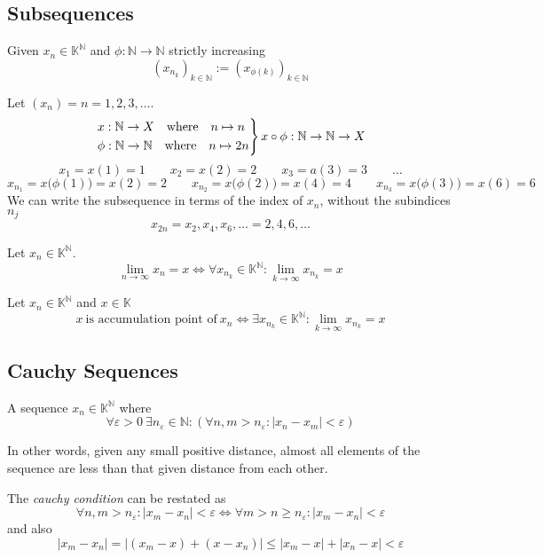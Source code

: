 \subsection{Subsequences}
\begin{definition}[Subsequence]
   Given \(x_n \in \mathbb{K}^\mathbb{N}\) and \(\phi: \mathbb{N} \to \mathbb{N}\) strictly increasing
   \[(x_{n_k})_{k \in \mathbb{N}} := (x_{\phi(k)})_{k \in \mathbb{N}}\]
\end{definition}
\begin{example}
   Let \((x_n) = n = 1, 2, 3, \ldots\).
   \[\begin{drcases}
         x: \mathbb{N} \to X \quad\text{where}\quad n \mapsto n \\
         \phi: \mathbb{N} \to \mathbb{N} \quad\text{where}\quad n \mapsto 2n
   \end{drcases} x \circ \phi: \mathbb{N} \to \mathbb{N} \to X\]
   \[x_1 = x(1) = 1 \qquad x_2 = x(2) = 2 \qquad x_3 = a(3) = 3 \qquad \ldots\]
   \[x_{n_1} = x\big(\phi(1)\big) = x(2) = 2 \qquad x_{n_2} = x\big(\phi(2)\big) = x(4) = 4 \qquad x_{n_3} = x\big(\phi(3)\big) = x(6) = 6\]
   We can write the subsequence in terms of the index of \(x_n\), without the subindices \(n_j\)
   \[x_{2n} = x_2, x_4, x_6, \ldots = 2, 4, 6, \ldots\]
\end{example}

\begin{theorem}\label{thm:all_subseq_conv}
   Let \(x_n \in \mathbb{K}^\mathbb{N}\).
   \[\lim_{n \to \infty} x_n = x \iff \forall x_{n_k} \in \mathbb{K}^\mathbb{N}: \lim_{k \to \infty} x_{n_k} = x\]
\end{theorem}

\begin{theorem}\label{thm:cp_iff_subseq}
   Let \(x_n \in \mathbb{K}^\mathbb{N}\) and \(x \in \mathbb{K}\)
   \[x~\text{is accumulation point of}~x_n \iff \exists x_{n_k} \in \mathbb{K}^\mathbb{N}: \lim_{k \to \infty} x_{n_k} = x\]
\end{theorem}

\subsection{Cauchy Sequences}
\begin{definition}
   A sequence \(x_n \in \mathbb{K}^\mathbb{N}\) where
   \[\forall \varepsilon > 0~\exists n_\varepsilon \in \mathbb{N}: (\forall n, m > n_\varepsilon: |x_n - x_m| < \varepsilon)\]
\end{definition}
\begin{remark}[Intuition]
   In other words, given any small positive distance, almost all elements of the sequence are less than that given distance from each other.
\end{remark}
\begin{remark}[Tips]
   The \emph{cauchy condition} can be restated as
   \[\forall n, m > n_\varepsilon: |x_m - x_n| < \varepsilon \iff \forall m > n \geq n_\varepsilon: |x_m - x_n| < \varepsilon\]
   and also
   \[|x_m - x_n| = |(x_m - x) + (x - x_n)| \leq |x_m - x| + |x_n - x| < \varepsilon\]
\end{remark}

